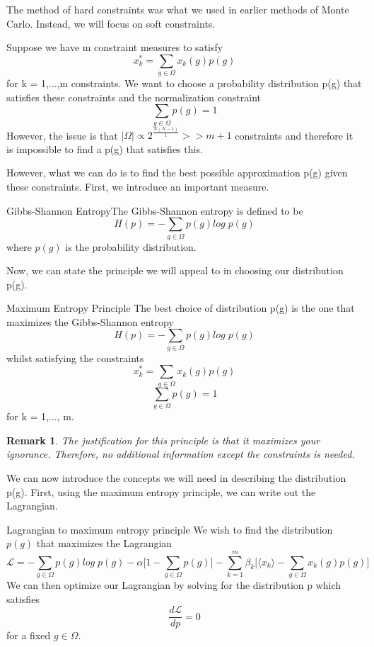 \documentclass[twoside]{article}
\newtheorem{remark}[theorem]{Remark}
\begin{document}
The method of hard constraints was what we used in earlier methods of Monte Carlo. Instead, we will focus on soft constraints.

Suppose we have m constraint measures to satisfy 
$$
x_k^* = \sum_{g \in \Omega}x_k(g)p(g)
$$
for k = 1,...,m constraints. We want to choose a probability distribution p(g) that satisfies these constraints and the normalization constraint 
$$
\sum_{g \in \Omega}p(g) = 1
$$
However, the issue is that $|\Omega| \propto 2^{\frac{N(N-1)}{1}} >> m + 1$ constraints and therefore it is impossible to find a p(g) that satisfies this.

However, what we can do is to find the best possible approximation p(g) given these constraints. First, we introduce an important measure.

\begin{definition_exam}{Gibbs-Shannon Entropy}{}The Gibbs-Shannon entropy is defined to be 
$$
H(p) = -\sum_{g \in \Omega}p(g)log\;p(g)
$$
where $p(g)$ is the probability distribution.
\end{definition_exam}

Now, we can state the principle we will appeal to in choosing our distribution p(g).

\begin{theorem_exam}{Maximum Entropy Principle}{} The best choice of distribution p(g) is the one that maximizes the Gibbs-Shannon entropy 
$$
H(p) = -\sum_{g \in \Omega}p(g)log\;p(g)
$$
whilst satisfying the constraints 
$$
x_k^* = \sum_{g \in \Omega}x_k(g)p(g)
$$
$$
\sum_{g \in \Omega}p(g) = 1
$$
for k = 1,..., m.
\end{theorem_exam}

\begin{remark}The justification for this principle is that it maximizes your ignorance. Therefore, no additional information except the constraints is needed.
\end{remark}

We can now introduce the concepts we will need in describing the distribution p(g). First, using the maximum entropy principle, we can write out the Lagrangian.

\begin{proposition_exam}{Lagrangian to maximum entropy principle}{} We wish to find the distribution $p(g)$ that maximizes the Lagrangian 
$$
\mathcal{L} = -\sum_{g \in \Omega}p(g)log\;p(g) - \alpha \bigg[1 - \sum_{g \in \Omega}p(g) \bigg] - \sum_{k=1}^{m}\beta_k\bigg[\langle x_k \rangle - \sum_{g \in \Omega}x_k(g)p(g) \bigg]
$$
We can then optimize our Lagrangian by solving for the distribution p which satisfies
$$
\frac{d \mathcal{L}}{d p} = 0
$$
for a fixed $g \in \Omega.$
\end{proposition_exam}
\end{document}
